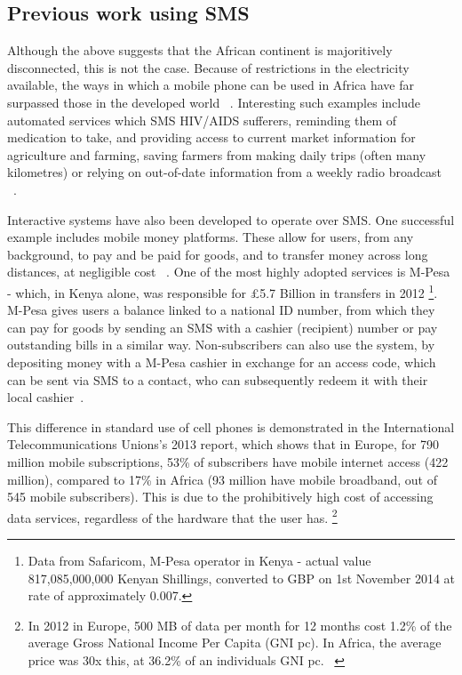 \documentclass{article}
\begin{document}
\subsection{Previous work using SMS}
Although the above suggests that the African continent is majoritively disconnected, this is not the case.  Because of restrictions in the electricity available, the ways in which a mobile phone can be used in Africa have far surpassed those in the developed world ~\cite{Fox:2011:Online}.  Interesting such examples include automated services which SMS HIV/AIDS sufferers, reminding them of medication to take, and providing access to current market information for agriculture and farming, saving farmers from making daily trips (often many kilometres) or relying on out-of-date information from a weekly radio broadcast ~\cite{Aker_Mobile_Phones_2010}.

Interactive systems have also been developed to operate over SMS.  One successful example includes mobile money platforms.  These allow for users, from any background, to pay and be paid for goods, and to transfer money across long distances, at negligible cost ~\cite{Aker_Mobile_Phones_2010}.  One of the most highly adopted services is M-Pesa - which, in Kenya alone, was responsible for £5.7 Billion in transfers in 2012 \footnote{Data from Safaricom, M-Pesa operator in Kenya - actual value 817,085,000,000 Kenyan Shillings, converted to GBP on 1st November 2014 at rate of approximately 0.007.}.  M-Pesa gives users a balance linked to a national ID number, from which they can pay for goods by sending an SMS with a cashier (recipient) number or pay outstanding bills in a similar way.  Non-subscribers can also use the system, by depositing money with a M-Pesa cashier in exchange for an access code, which can be sent via SMS to a contact, who can subsequently redeem it with their local cashier~\cite{Aker_Mobile_Phones_2010}.

This difference in standard use of cell phones is demonstrated in the International Telecommunications Unions's 2013 report, which shows that in Europe, for 790 million mobile subscriptions, 53\% of subscribers have mobile internet access (422 million), compared to 17\% in Africa (93 million have mobile broadband, out of 545 mobile subscribers).  This is due to the prohibitively high cost of accessing data services, regardless of the hardware that the user has.  \footnote{In 2012 in Europe, 500 MB of data per month for 12 months cost 1.2\% of the average Gross National Income Per Capita (GNI pc).  In Africa, the average price was 30x this, at 36.2\% of an individuals GNI pc.  ~\cite{ITU_Information_Society_2013}}
\end{document}

